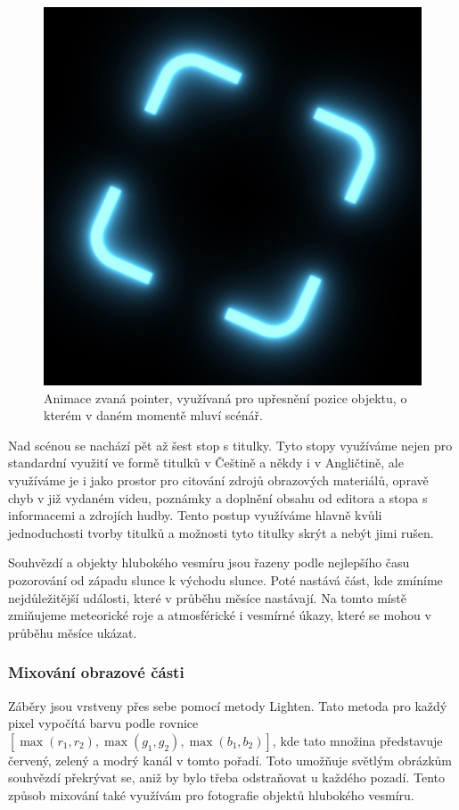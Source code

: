 \documentclass[12pt,a4paper,titlepage]{article}
\begin{document}
\begin{figure}[H]
	\centering
	\includegraphics[width=.5\textwidth]{pointer.eps}
	\caption{Animace zvaná pointer, využívaná pro upřesnění pozice objektu, o kterém v daném momentě mluví scénář.}\label{img:pointer}
\end{figure}

Nad scénou se nachází pět až šest stop s titulky. Tyto stopy využíváme nejen pro standardní využití ve formě titulků v Češtině a někdy i v Angličtině, ale využíváme je i jako prostor pro citování zdrojů obrazových materiálů, opravě chyb v již vydaném videu, poznámky a doplnění obsahu od editora a stopa s informacemi a zdrojích hudby. Tento postup využíváme hlavně kvůli jednoduchosti tvorby titulků a možnosti tyto titulky skrýt a nebýt jimi rušen. 

Souhvězdí a objekty hlubokého vesmíru jsou řazeny podle nejlepšího času pozorování od západu slunce k východu slunce. Poté nastává část, kde zmíníme nejdůležitější události, které v průběhu měsíce nastávají. Na tomto místě zmiňujeme meteorické roje a atmosférické i vesmírné úkazy, které se mohou v průběhu měsíce ukázat.
\subsubsection{Mixování obrazové části}
Záběry jsou vrstveny přes sebe pomocí metody Lighten. Tato metoda pro každý pixel vypočítá barvu podle rovnice $[\max(r_1, r_2), \max(g_1, g_2), \max(b_1, b_2)]$, kde tato množina představuje červený, zelený a modrý kanál v tomto pořadí. Toto umožňuje světlým obrázkům souhvězdí překrývat se, aniž by bylo třeba odstraňovat u každého pozadí. Tento způsob mixování také využívám pro fotografie objektů hlubokého vesmíru. 
\end{document}

